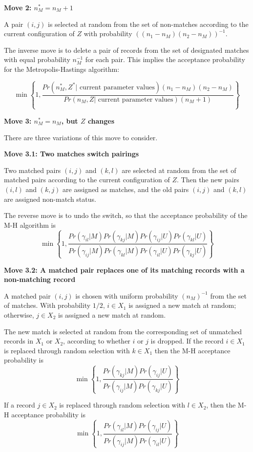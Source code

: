 \documentclass[11pt,reqno]{amsart}
\begin{document}
\textbf{Move 2: $n_M^* = n_M + 1 $ }

A pair $(i,j)$ is selected at random from the set of non-matches according to the current configuration of $Z$ with probability $\left((n_1-n_M)(n_2-n_M)\right)^{-1}$.  

The inverse move is to delete a pair of records from the set of designated matches with equal probability $n_M^{-1}$ for each pair.  This implies the acceptance probability for the Metropolis-Hastings algorithm:

\[ \min \left\{ 1, \frac{Pr\left(n_M^*, Z^* | \text{ current parameter values}\right)(n_1 - n_M)(n_2 - n_M)}{Pr\left(n_M, Z | \text{ current parameter values}\right)(n_M + 1)} \right\} \] 

\textbf{Move 3: $n_M^* = n_M$, but $Z$ changes} 

There are three variations of this move to consider. 

\textbf{Move 3.1: Two matches switch pairings}

Two matched pairs $(i,j)$ and $(k, l)$ are selected at random from the set of matched pairs according to the current configuration of $Z$.   Then the new pairs $(i,l)$ and $(k,j)$ are assigned as matches, and the old pairs $(i,j)$ and $(k,l)$ are assigned non-match status. 

The reverse move is to undo the switch, so that the acceptance probability of the M-H algorithm is
\[ \min \left\{ 1, \frac{Pr(\gamma_{il} | M) Pr(\gamma_{kj} | M) Pr(\gamma_{ij} | U) Pr(\gamma_{kl} | U)}{Pr(\gamma_{ij} | M) Pr(\gamma_{kl} | M) Pr(\gamma_{il} | U) Pr(\gamma_{kj} | U)} \right\} \] 

\textbf{Move 3.2: A matched pair replaces one of its matching records with a non-matching record}

A matched pair $(i,j)$ is chosen with uniform probability $(n_M)^{-1}$ from the set of matches.  With probability $1/2$, $i\in X_1$ is assigned a new match at random; otherwise, $j\in X_2$ is assigned a new match at random.

The new match is selected at random from the corresponding set of unmatched records in $X_1$ or $X_2$, according to whether $i$ or $j$ is dropped.   If the record $i \in X_1$ is replaced through random selection with $k \in X_1$ then the M-H acceptance probability is
\[ \min \left\{ 1, \frac{Pr(\gamma_{kj} | M) Pr(\gamma_{ij} | U)}{Pr(\gamma_{ij}| M) Pr(\gamma_{kj} | U)} \right\} \]

If a record $j\in X_2$ is replaced through random selection with $l \in X_2$, then the M-H acceptance probability is 
\[ \min \left\{1, \frac{Pr(\gamma_{il} | M) Pr(\gamma_{ij} | U)}{Pr(\gamma_{ij} | M) Pr(\gamma_{il} | U)} \right\} \]
\end{document}
